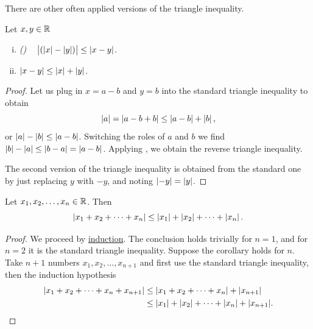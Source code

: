 There are other often applied versions of the triangle inequality.

\begin{cor}
Let $x,y \in {\mathbb{R}}$
\begin{enumerate}[(i)]
\item \emph{()}
~
$\bigl\lvert (\left\lvert {x} \right\rvert-\left\lvert {y} \right\rvert) \bigr\rvert \leq \left\lvert {x-y} \right\rvert$.
\item $\left\lvert {x-y} \right\rvert \leq \left\lvert {x} \right\rvert+\left\lvert {y} \right\rvert$.
\end{enumerate}
\end{cor}

\begin{proof}
Let us plug in $x=a-b$ and $y=b$ into the standard
triangle inequality to obtain
\begin{equation*}
\left\lvert {a} \right\rvert = \left\lvert {a-b+b} \right\rvert \leq \left\lvert {a-b} \right\rvert + \left\lvert {b} \right\rvert ,
\end{equation*}
or $\left\lvert {a} \right\rvert-\left\lvert {b} \right\rvert \leq \left\lvert {a-b} \right\rvert$.  Switching the roles of $a$ and $b$
we find 
$\left\lvert {b} \right\rvert-\left\lvert {a} \right\rvert \leq \left\lvert {b-a} \right\rvert = \left\lvert {a-b} \right\rvert$.  Applying
, we obtain the reverse triangle
inequality.

The second version of the triangle inequality is obtained from the standard
one by just replacing $y$ with $-y$, and noting $\left\lvert {-y} \right\rvert =
\left\lvert {y} \right\rvert$.
\end{proof}

\begin{cor}
Let $x_1, x_2, \ldots, x_n \in {\mathbb{R}}$.  Then
\begin{equation*}
\left\lvert {x_1 + x_2 + \cdots + x_n} \right\rvert \leq 
\left\lvert {x_1} \right\rvert + \left\lvert {x_2} \right\rvert + \cdots + \left\lvert {x_n} \right\rvert .
\end{equation*}
\end{cor}

\begin{proof}
We proceed by \hyperref[induction:thm]{induction}.
The conclusion holds trivially for $n=1$, and
for $n=2$ it is the standard triangle inequality.  Suppose the corollary
holds for $n$.  Take $n+1$ numbers $x_1,x_2,\ldots,x_{n+1}$ and 
first use the standard triangle inequality, then the induction
hypothesis
\begin{equation*}
\begin{split}
\lvert {x_1 + x_2 + \cdots + x_n + x_{n+1}} \rvert & \leq 
\lvert {x_1 + x_2 + \cdots + x_n} \rvert + \lvert {x_{n+1}} \rvert \\
& \leq 
\lvert {x_1} \rvert + \lvert {x_2} \rvert + \cdots + \lvert {x_n} \rvert + \lvert {x_{n+1}} \rvert .  \qedhere
\end{split}
\end{equation*}
\end{proof}

